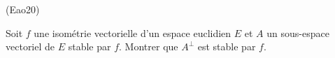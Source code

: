 \begin{tiny}(Eao20)\end{tiny} Soit $f$ une isométrie vectorielle d'un espace euclidien $E$ et $A$ un sous-espace vectoriel de $E$ stable par $f$. Montrer que $A^{\bot}$ est stable par $f$.